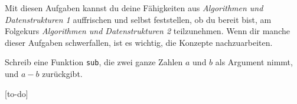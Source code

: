 \documentclass{uebung_cs}
\begin{document}
Mit diesen Aufgaben kannst du deine Fähigkeiten aus \emph{Algorithmen und Datenstrukturen 1} auffrischen und selbst feststellen, ob du bereit bist, am Folgekurs \emph{Algorithmen und Datenstrukturen 2} teilzunehmen. Wenn dir manche dieser Aufgaben schwerfallen, ist es wichtig, die Konzepte nachzuarbeiten.

\begin{aufgabe}[Subtraktion]
    Schreib eine Funktion \texttt{sub}, die zwei ganze Zahlen $a$ und $b$ als Argument nimmt, und $a-b$ zurückgibt.
\end{aufgabe}

[to-do]
\end{document}
